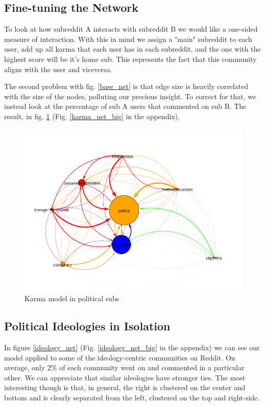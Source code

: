\documentclass[11pt]{article}
\begin{document}
\subsection{Fine-tuning the Network}
To look at how subreddit A interacts with subreddit B we would like a one-sided measure of interaction. With this in mind we assign a "main" subreddit to each user, add up all karma that each user has in each subreddit, and the one with the highest score will be it's home sub. This represents the fact that this community aligns with the user and viceversa.

The second problem with fig. \ref{base_net} is that edge size is heavily correlated with the size of the nodes, polluting our precious insight. To correct for that, we instead look at the percentage of sub A users that commented on sub B. The result, in fig. \ref{karma_net} (Fig. \ref{karma_net_big} in the appendix).

\begin{figure}[h]
	\includegraphics[width=\columnwidth]{img/karma_model.png}
	\caption{\label{karma_net} Karma model in political subs}
\end{figure}

\subsection{Political Ideologies in Isolation}

In figure \ref{ideology_net} (Fig. \ref{ideology_net_big} in the appendix) we can see our model applied to some of the ideology-centric communities on Reddit. On average, only $2\%$ of each community went on and commented in a particular other. We can appreciate that similar ideologies have stronger ties. The most interesting though is that, in general, the right is clustered on the center and bottom and is clearly separated from the left, clustered on the top and right-side.
\end{document}
